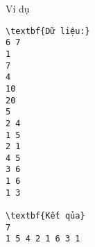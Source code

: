 Ví dụ
\begin{verbatim}
\textbf{Dữ liệu:}
6 7
1
7
4
10
20
5
2 4
1 5
2 1
4 5
3 6
1 6
1 3

\textbf{Kết qủa}
7
1 5 4 2 1 6 3 1
\end{verbatim}